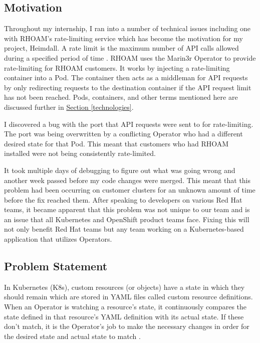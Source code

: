\documentclass{article}
\begin{document}
\subsection{Motivation} 
Throughout my internship, I ran into a number of technical issues including one with RHOAM's rate-limiting service which has become the motivation for my project, Heimdall. A rate limit is the maximum number of API calls allowed during a specified period of time \cite{understanding-apis}. RHOAM uses the Marin3r Operator to provide rate-limiting for RHOAM customers. It works by injecting a rate-limiting container into a Pod. The container then acts as a middleman for API requests by only redirecting requests to the destination container if the API request limit has not been reached. Pods, containers, and other terms mentioned here are discussed further in \hyperlink{technologies}{Section \ref{technologies}}. \\\par I discovered a bug with the port that API requests were sent to for rate-limiting. The port was being overwritten by a conflicting Operator who had a different desired state for that Pod. This meant that customers who had RHOAM installed were not being consistently rate-limited. \\\par It took multiple days of debugging to figure out what was going wrong and another week passed before my code changes were merged. This meant that this problem had been occurring on customer clusters for an unknown amount of time before the fix reached them. After speaking to developers on various Red Hat teams, it became apparent that this problem was not unique to our team and is an issue that all Kubernetes and OpenShift product teams face. Fixing this will not only benefit Red Hat teams but any team working on a Kubernetes-based application that utilizes Operators.



\subsection{Problem Statement}
In Kubernetes (K8s), custom resources (or objects) have a state in which they should remain which are stored in YAML files called custom resource definitions. When an Operator is watching a resource's state, it continuously compares the state defined in that resource's YAML definition with its actual state. If these don't match, it is the Operator's job to make the necessary changes in order for the desired state and actual state to match \cite{operator-pattern}. 
\end{document}
